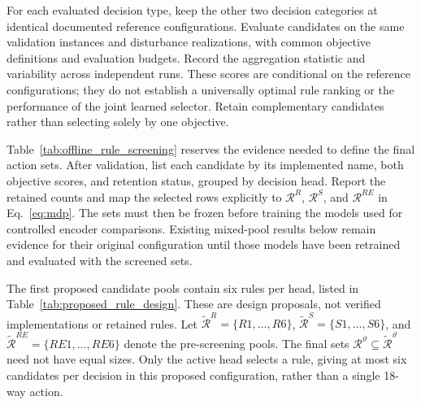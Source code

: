 For each evaluated decision type, keep the other two decision categories at identical documented
reference configurations. Evaluate candidates on the same validation instances and disturbance
realizations, with common objective definitions and evaluation budgets. Record the aggregation
statistic and variability across independent runs. These scores are conditional on the reference
configurations; they do not establish a universally optimal rule ranking or the performance of the
joint learned selector. Retain complementary candidates rather than selecting solely by one objective.

Table~\ref{tab:offline_rule_screening} reserves the evidence needed to define the final action sets.
After validation, list each candidate by its implemented name, both objective scores, and retention
status, grouped by decision head. Report the retained counts and map the selected rows explicitly
to $\mathcal R^R$, $\mathcal R^S$, and $\mathcal R^{RE}$ in Eq.~\eqref{eq:mdp}.
The sets must then be frozen before training the models used for controlled encoder comparisons.
Existing mixed-pool results below remain evidence for their original configuration until those
models have been retrained and evaluated with the screened sets.

The first proposed candidate pools contain six rules per head, listed in
Table~\ref{tab:proposed_rule_design}. These are design proposals, not verified implementations
or retained rules. Let $\widetilde{\mathcal R}^{R}=\{R1,\ldots,R6\}$,
$\widetilde{\mathcal R}^{S}=\{S1,\ldots,S6\}$, and
$\widetilde{\mathcal R}^{RE}=\{RE1,\ldots,RE6\}$ denote the pre-screening pools.
The final sets $\mathcal R^{\vartheta}\subseteq\widetilde{\mathcal R}^{\vartheta}$ need not
have equal sizes. Only the active head selects a rule, giving at most six candidates per decision
in this proposed configuration, rather than a single 18-way action.

